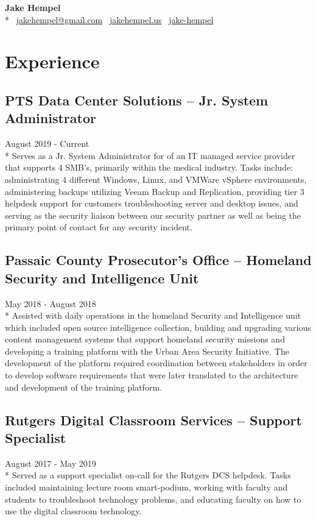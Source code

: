 \documentclass{article}
\begin{document}
\begin{samepage}
\begin{center}
\huge{\textbf{Jake Hempel}} \\*
\large{\faEnvelope \, \href{mailto:jakehempel@gmail.com}{jakehempel@gmail.com}
\faGlobe \, \href{https://jakehempel.us}{jakehempel.us}}
\faLinkedinSquare \, \href{https://www.linkedin.com/in/jake-hempel/}{jake-hempel}
\end{center}

\section{Experience}

\subsection{PTS Data Center Solutions -- Jr. System Administrator}
August 2019 - Current\\*
Serves as a Jr. System Administrator for of an IT managed service provider that supports 4 SMB's, primarily within the medical industry. Tasks include: administrating 4 different Windows, Linux, and VMWare vSphere environments, administering backups utilizing Veeam Backup and Replication, providing tier 3 helpdesk support for customers troubleshooting server and desktop issues, and serving as the security liaison between our security partner as well as being the primary point of contact for any security incident.

\subsection{Passaic County Prosecutor's Office -- Homeland Security and Intelligence Unit}
May 2018 - August 2018\\*
Assisted with daily operations in the homeland Security and Intelligence unit which included open source intelligence collection, building and upgrading various content management systems that support homeland security missions and developing a training platform with the Urban Area Security Initiative.  The development of the platform required coordination between stakeholders in order to develop software requirements that were later translated to the architecture and development of the training platform.

\subsection{Rutgers Digital Classroom Services -- Support Specialist}
August 2017 - May 2019\\*
Served as a support specialist on-call for the Rutgers DCS helpdesk. Tasks included maintaining lecture room smart-podium, working with faculty and students to troubleshoot technology problems, and educating faculty on how to use the digital classroom technology.


\end{samepage}
\end{document}
